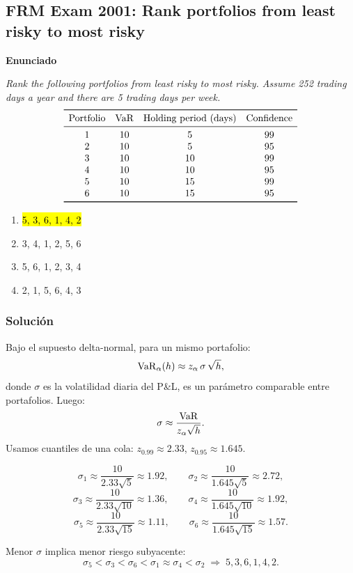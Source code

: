 ﻿\subsection{FRM Exam 2001: Rank portfolios from least risky to most risky}

\textbf{Enunciado}

\emph{Rank the following portfolios from least risky to most risky. Assume 252 trading days a year and there are 5 trading days per week.}
\[
\begin{array}{c c c c}
\toprule
\text{Portfolio} & \text{VaR} & \text{Holding period (days)} & \text{Confidence}\\
\midrule
1 & 10 & 5  & 99\\
2 & 10 & 5  & 95\\
3 & 10 & 10 & 99\\
4 & 10 & 10 & 95\\
5 & 10 & 15 & 99\\
6 & 10 & 15 & 95\\
\bottomrule
\end{array}
\]
\begin{enumerate}[label=\alph*.]
\item \hl{5, 3, 6, 1, 4, 2}
\item 3, 4, 1, 2, 5, 6
\item 5, 6, 1, 2, 3, 4
\item 2, 1, 5, 6, 4, 3
\end{enumerate}

\subsubsection*{Solución}

Bajo el supuesto delta-normal, para un mismo portafolio:
\[
\mathrm{VaR}_\alpha(h)\approx z_\alpha\,\sigma\,\sqrt{h},
\]
donde \(\sigma\) es la volatilidad diaria del P\&L, es un parámetro comparable entre portafolios.
Luego:
\[
\sigma \approx \frac{\mathrm{VaR}}{z_\alpha\sqrt{h}}.
\]
Usamos cuantiles de una cola: \(z_{0.99}\approx 2.33\), \(z_{0.95}\approx 1.645\).

\[
\sigma_1\approx \frac{10}{2.33\sqrt5}\approx 1.92,\qquad
\sigma_2\approx \frac{10}{1.645\sqrt5}\approx 2.72,
\]
\[
\sigma_3\approx \frac{10}{2.33\sqrt{10}}\approx 1.36,\qquad
\sigma_4\approx \frac{10}{1.645\sqrt{10}}\approx 1.92,
\]
\[
\sigma_5\approx \frac{10}{2.33\sqrt{15}}\approx 1.11,\qquad
\sigma_6\approx \frac{10}{1.645\sqrt{15}}\approx 1.57.
\]

Menor \(\sigma\) implica menor riesgo subyacente:
\[
\sigma_5<\sigma_3<\sigma_6<\sigma_1\approx \sigma_4<\sigma_2
\;\Rightarrow\;
5,3,6,1,4,2.
\]











